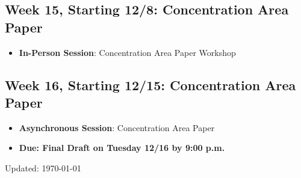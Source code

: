 \documentclass[12pt, letterpaper]{article}
\begin{document}
\subsection*{Week 15, Starting 12/8: Concentration Area Paper}
\begin{itemize}
    \item \textbf{In-Person Session}: Concentration Area Paper Workshop
\end{itemize}

\subsection*{Week 16, Starting 12/15: Concentration Area Paper}
\begin{itemize}
    \item \textbf{Asynchronous Session}: Concentration Area Paper
    \item \textbf{Due: Final Draft on Tuesday 12/16 by 9:00 p.m.}
\end{itemize}


          


            \singlespace
            
            

\begin{flushright}
Updated: \today
\end{flushright}
\end{document}
